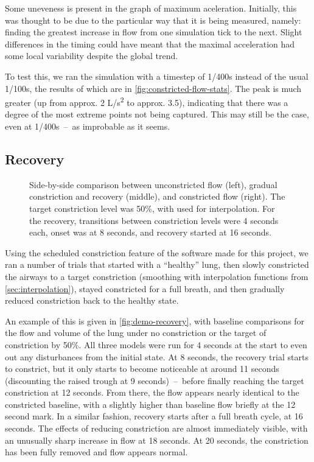 Some uneveness is present in the graph of maximum aceleration. Initially, this was thought to be due
to the particular way that it is being measured, namely: finding the greatest increase in flow from
one simulation tick to the next. Slight differences in the timing could have meant that the maximal
acceleration had some local variability despite the global trend.

To test this, we ran the simulation with a timestep of 1/400s instead of the usual 1/100s, the
results of which are in \autoref{fig:constricted-flow-stats}. The peak is much greater (up from
approx. 2 L/s\textsuperscript{2} to approx. 3.5), indicating that there was a degree of the most
extreme points not being captured. This may still be the case, even at 1/400s~--~as improbable as it
seems.

\subsection{Recovery}

\begin{figure}[ht!]
    \centering
    \begin{tikzpicture}[scale=0.6]
        
        
        
    \end{tikzpicture}
    \caption{
        Side-by-side comparison between unconstricted flow (left), gradual constriction and recovery
        (middle), and constricted flow (right). The target constriction level was 50\%, with
         used for interpolation. For the recovery, transitions between constriction
        levels were 4 seconds each, onset was at 8 seconds, and recovery started at 16 seconds.
    }
    \label{fig:demo-recovery}
\end{figure}

Using the scheduled constriction feature of the software made for this project, we ran a number of
trials that started with a ``healthy'' lung, then slowly constricted the airways to a target
constriction (smoothing with interpolation functions from \autoref{sec:interpolation}), stayed
constricted for a full breath, and then gradually reduced constriction back to the healthy state.

An example of this is given in \autoref{fig:demo-recovery}, with baseline comparisons for the flow
and volume of the lung under no constriction or the target of constriction by 50\%. All three models
were run for 4 seconds at the start to even out any disturbances from the initial state. At 8
seconds, the recovery trial starts to constrict, but it only starts to become noticeable at around
11 seconds (discounting the raised trough at 9 seconds)~--~before finally reaching the target
constriction at 12 seconds. From there, the flow appears nearly identical to the constricted
baseline, with a slightly higher than baseline flow briefly at the 12 second mark. In a similar
fashion, recovery starts after a full breath cycle, at 16 seconds. The effects of reducing
constriction are almost immediately visible, with an unusually sharp increase in flow at 18 seconds.
At 20 seconds, the constriction has been fully removed and flow appears normal.

